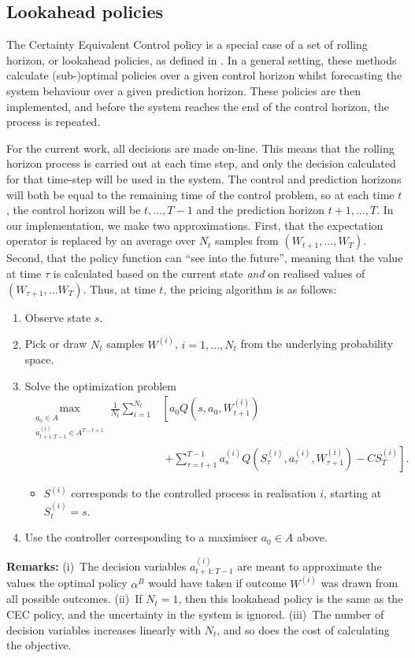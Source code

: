 \documentclass[main.tex]{subfiles}
\begin{document}
\subsection{Lookahead policies}
The Certainty Equivalent Control policy is a special case of
a set of rolling horizon, or lookahead policies, as defined in
\citet[Ch.~6]{powell2011approximate}.
In a general setting, these methods
calculate (sub-)optimal policies over a given control
horizon whilst forecasting the system behaviour over a given
prediction horizon.
These policies are then implemented, and before the system reaches the
end of the control horizon, the process is repeated.

For the current work, all decisions are made on-line. This means
that the rolling horizon process is carried out at each time step, and
only the decision calculated for that time-step will be used in
the system. The control and prediction horizons will both be equal to
the remaining time of the control problem, so at each time $t$, the
control horizon will be $t,\dots,T-1$ and the prediction horizon
$t+1,\dots,T$.
In our implementation, we make two approximations.
First, that the expectation operator is replaced by
an average over $N_t$ samples from $(W_{t+1},\dots,W_T)$.
Second, that
the policy function can ``see into the future'', meaning that
the value at time $\tau$ is calculated based on
the current state \emph{and}  on realised values of $(W_{\tau+1},\dots W_{T})$.
Thus, at time $t$, the pricing algorithm is as follows:
\begin{enumerate}
\item Observe state $s$.
\item Pick or draw $N_t$ samples $W^{(i)}$, $i=1,\dots,N_t$ from the
  underlying probability space.
\item Solve the optimization problem
  \begin{align}\nonumber
    \max_{\substack{a_0\in A\\a_{t+1:T-1}^{(i)}\in A^{T-{t+1}}}}
    \frac{1}{N_t}\sum_{i=1}^{N_t}&\left[
    a_0Q(s,a_0,W_{t+1}^{(i)})
    \phantom{+\sum_{\tau=t+1}^{T-1}}\right.\\
      &\;\left.+\sum_{\tau=t+1}^{T-1}a_s^{(i)}Q(S_\tau^{(i)},a_\tau^{(i)},W_{\tau+1}^{(i)})
      -C S_T^{(i)}\right].
  \end{align}
  \begin{itemize}
  \item $S^{(i)}$ corresponds to the
    controlled process in realisation $i$, starting at $S_t^{(i)}=s$.
  \end{itemize}
\item Use the controller corresponding to a maximiser $a_0\in
  A$ above.
\end{enumerate}
\textbf{Remarks:} (i)~The decision variables $a_{t+1:T-1}^{(i)}$ are meant to
approximate the values the optimal policy $\alpha^B$ would have taken
if outcome $W^{(i)}$ was drawn from all possible outcomes.
(ii)~If $N_t=1$, then this lookahead policy is the same as the
CEC policy, and the uncertainty in the system is ignored.
(iii)~The number of decision variables increases linearly with $N_t$, and
so does the cost of calculating the objective.
\end{document}
